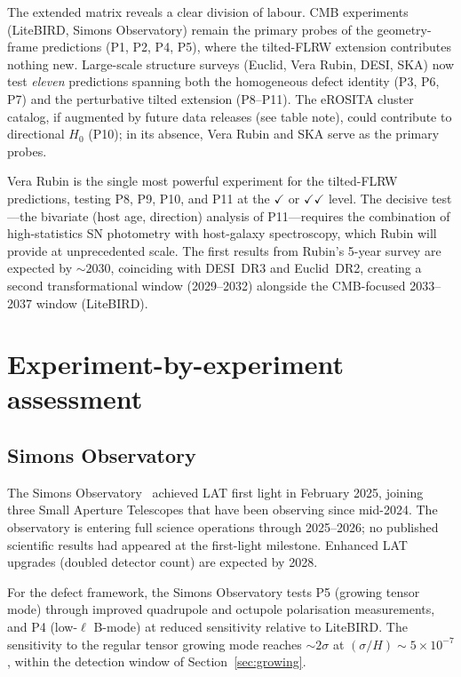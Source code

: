 The extended matrix reveals a clear division of labour.  CMB
experiments (LiteBIRD, Simons Observatory) remain the primary
probes of the geometry-frame predictions (P1, P2, P4, P5), where
the tilted-FLRW extension contributes nothing new.  Large-scale
structure surveys (Euclid, Vera Rubin, DESI, SKA) now test
\emph{eleven} predictions spanning both the homogeneous defect
identity (P3, P6, P7) and the perturbative tilted extension
(P8--P11).  The eROSITA cluster catalog, if augmented by future
data releases (see table note), could contribute to directional
$H_0$ (P10); in its absence, Vera Rubin and SKA serve as the
primary probes.

Vera Rubin is the single most powerful experiment for the
tilted-FLRW predictions, testing P8, P9, P10, and P11 at the
$\checkmark$ or $\checkmark\checkmark$ level.  The decisive
test---the bivariate (host age, direction) analysis of P11---requires
the combination of high-statistics SN photometry with host-galaxy
spectroscopy, which Rubin will provide at unprecedented scale.
The first results from Rubin's 5-year survey are expected by
$\sim\!2030$, coinciding with DESI~DR3 and Euclid~DR2, creating
a second transformational window (2029--2032) alongside the
CMB-focused 2033--2037 window (LiteBIRD).



\section{Experiment-by-experiment assessment}
\label{sec:experiment-assess}
\label{sec:forecast-experiments}

\subsection{Simons Observatory}

The Simons Observatory~\cite{SimonsObs2019} achieved
LAT first light in February 2025,
joining three Small Aperture Telescopes that have been observing
since mid-2024.  The observatory is entering full science
operations through 2025--2026; no published scientific results
had appeared at the first-light milestone.  Enhanced LAT
upgrades (doubled detector count) are expected by 2028.

For the defect framework, the Simons Observatory tests P5
(growing tensor mode) through improved quadrupole and octupole
polarisation measurements, and P4 (low-$\ell$ B-mode) at
reduced sensitivity relative to LiteBIRD.  The sensitivity to
the regular tensor growing mode reaches $\sim 2\sigma$ at
$(\sigma/H) \sim 5 \times 10^{-7}$, within the detection
window of Section~\ref{sec:growing}.


